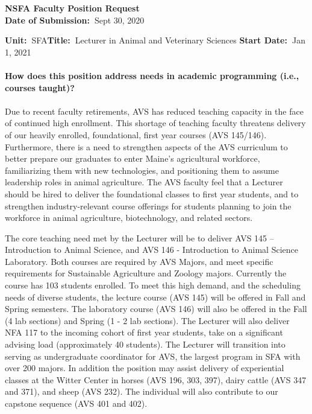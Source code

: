 \documentclass[11pt]{article}
\begin{document}
\sloppy \rmfamily
\begin{center}\textbf{NSFA Faculty Position Request\\Date of Submission:~}Sept 30, 2020\end{center}

\noindent\textbf{Unit:~}SFA\hfill\textbf{Title:~}Lecturer in Animal and Veterinary Sciences \hfill \textbf{Start Date:~}Jan 1, 2021\\~\\
\textbf{How does this position address needs in academic programming (i.e., courses taught)?}\\~\\
\small\sffamily Due to recent faculty retirements, AVS has reduced teaching capacity in the face of continued high enrollment. This shortage of teaching faculty threatens delivery of our heavily enrolled, foundational, first year courses (AVS 145/146). Furthermore, there is a need to strengthen aspects of the AVS curriculum to better prepare our graduates to enter Maine’s agricultural workforce, familiarizing them with new technologies, and positioning them to assume leadership roles in animal agriculture. The AVS faculty feel that a Lecturer should be hired to deliver the foundational classes to first year students, and to strengthen industry-relevant course offerings for students planning to join the workforce in animal agriculture, biotechnology, and related sectors.

The core teaching need met by the Lecturer will be to deliver AVS 145 – Introduction to Animal Science, and AVS 146 - Introduction to Animal Science Laboratory. Both courses are required by AVS Majors, and meet specific requirements for Sustainable Agriculture and Zoology majors. Currently the course has 103 students enrolled. To meet this high demand, and the scheduling needs of diverse students, the lecture course (AVS 145) will be offered in Fall and Spring semesters. The laboratory course (AVS 146) will also be offered in the Fall (4 lab sections) and Spring (1 - 2 lab sections).  The Lecturer will also deliver NFA 117 to the incoming cohort of first year students, take on a significant advising load (approximately 40 students). The Lecturer will transition into serving as undergraduate coordinator for AVS, the largest program in SFA with over 200 majors. In addition the position may assist delivery of experiential classes at the Witter Center in horses (AVS 196, 303, 397), dairy cattle (AVS 347 and 371), and sheep (AVS 232). The individual will also contribute to our capstone sequence (AVS 401 and 402). 
\end{document}
